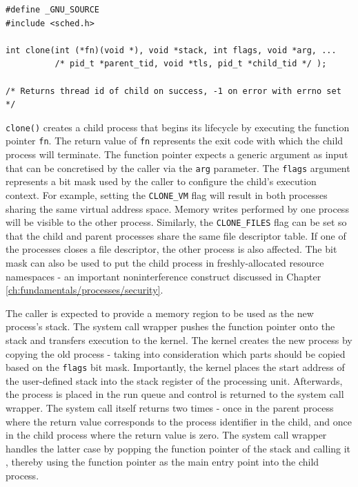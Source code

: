 \begin{lstlisting}[style=syscalls, caption={Clone System Call Wrapper}]
#define _GNU_SOURCE
#include <sched.h>

int clone(int (*fn)(void *), void *stack, int flags, void *arg, ...
          /* pid_t *parent_tid, void *tls, pid_t *child_tid */ );

/* Returns thread id of child on success, -1 on error with errno set */

\end{lstlisting}
\verb|clone()| creates a child process that begins its lifecycle by executing 
the function pointer \verb|fn|. The return value of \verb|fn| represents the exit code with which 
the child process will terminate. The function pointer expects a generic argument 
as input that can be concretised by the caller via the \verb|arg| parameter.
The \verb|flags| argument represents a bit mask used by the caller to configure 
the child's execution context. For example, setting the \verb|CLONE_VM| flag will result in 
both processes sharing the same virtual address space. Memory writes performed by one process will 
be visible to the other process. Similarly, the \verb|CLONE_FILES| flag can be set so that 
the child and parent processes share the same file descriptor table. If one of the processes 
closes a file descriptor, the other process is also affected. The bit mask can also be used 
to put the child process in freshly-allocated resource namespaces - an important noninterference construct 
discussed in Chapter \ref{ch:fundamentals/processes/security}.

The caller is expected to provide a memory region to be used as the new process's stack. 
The system call wrapper pushes the function pointer onto the stack and transfers execution 
to the kernel. The kernel creates the new process by copying the old process - taking into consideration 
which parts should be copied based on the \verb|flags| bit mask. Importantly, the kernel places 
the start address of the user-defined stack into the stack register of the processing unit.
Afterwards, the process is placed in the run queue and control is returned to the system call wrapper.
The system call itself returns two times - once in the parent process where the return value corresponds 
to the process identifier in the child, and once in the child process where the return value is zero. 
The system call wrapper handles the latter case by popping the function pointer of the stack 
and calling it \cite{aarch64/clone.S}, thereby using the function pointer as the main entry point 
into the child process.

